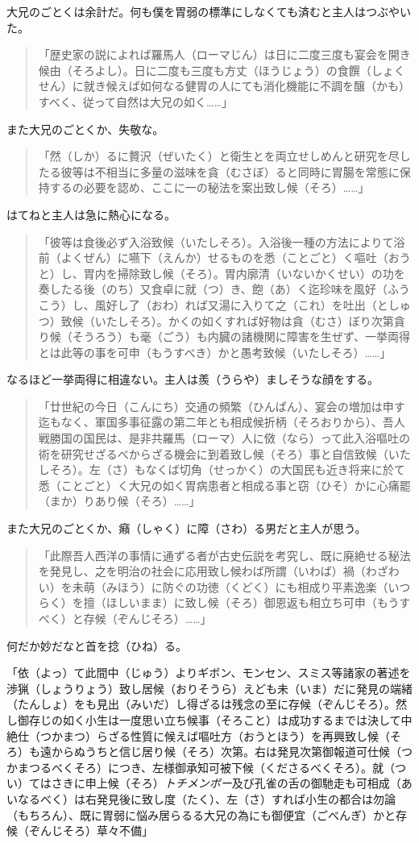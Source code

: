 \documentclass{book}
\begin{document}
大兄のごとくは余計だ。何も僕を胃弱の標準にしなくても済むと主人はつぶやいた。

\blockquote{「歴史家の説によれば羅馬人（ローマじん）は日に二度三度も宴会を開き候由（そろよし）。日に二度も三度も方丈（ほうじょう）の食饌（しょくせん）に就き候えば如何なる健胃の人にても消化機能に不調を醸（かも）すべく、従って自然は大兄の如く\ldots{}\ldots{}」}

また大兄のごとくか、失敬な。

\blockquote{「然（しか）るに贅沢（ぜいたく）と衛生とを両立せしめんと研究を尽したる彼等は不相当に多量の滋味を貪（むさぼ）ると同時に胃腸を常態に保持するの必要を認め、ここに一の秘法を案出致し候（そろ）\ldots{}\ldots{}」}

はてねと主人は急に熱心になる。

\blockquote{「彼等は食後必ず入浴致候（いたしそろ）。入浴後一種の方法によりて浴前（よくぜん）に嚥下（えんか）せるものを悉（ことごと）く嘔吐（おうと）し、胃内を掃除致し候（そろ）。胃内廓清（いないかくせい）の功を奏したる後（のち）又食卓に就（つ）き、飽（あ）く迄珍味を風好（ふうこう）し、風好し了（おわ）れば又湯に入りて之（これ）を吐出（としゅつ）致候（いたしそろ）。かくの如くすれば好物は貪（むさ）ぼり次第貪り候（そうろう）も毫（ごう）も内臓の諸機関に障害を生ぜず、一挙両得とは此等の事を可申（もうすべき）かと愚考致候（いたしそろ）\ldots{}\ldots{}」}

なるほど一挙両得に相違ない。主人は羨（うらや）ましそうな顔をする。

\blockquote{「廿世紀の今日（こんにち）交通の頻繁（ひんぱん）、宴会の増加は申す迄もなく、軍国多事征露の第二年とも相成候折柄（そろおりから）、吾人戦勝国の国民は、是非共羅馬（ローマ）人に傚（なら）って此入浴嘔吐の術を研究せざるべからざる機会に到着致し候（そろ）事と自信致候（いたしそろ）。左（さ）もなくば切角（せっかく）の大国民も近き将来に於て悉（ことごと）く大兄の如く胃病患者と相成る事と窃（ひそ）かに心痛罷（まか）りあり候（そろ）\ldots{}\ldots{}」}

また大兄のごとくか、癪（しゃく）に障（さわ）る男だと主人が思う。

\blockquote{「此際吾人西洋の事情に通ずる者が古史伝説を考究し、既に廃絶せる秘法を発見し、之を明治の社会に応用致し候わば所謂（いわば）禍（わざわい）を未萌（みほう）に防ぐの功徳（くどく）にも相成り平素逸楽（いつらく）を擅（ほしいまま）に致し候（そろ）御恩返も相立ち可申（もうすべく）と存候（ぞんじそろ）\ldots{}\ldots{}」}

何だか妙だなと首を捻（ひね）る。

「依（よっ）て此間中（じゅう）よりギボン、モンセン、スミス等諸家の著述を渉猟（しょうりょう）致し居候（おりそうら）えども未（いま）だに発見の端緒（たんしょ）をも見出（みいだ）し得ざるは残念の至に存候（ぞんじそろ）。然し御存じの如く小生は一度思い立ち候事（そろこと）は成功するまでは決して中絶仕（つかまつ）らざる性質に候えば嘔吐方（おうとほう）を再興致し候（そろ）も遠からぬうちと信じ居り候（そろ）次第。右は発見次第御報道可仕候（つかまつるべくそろ）につき、左様御承知可被下候（くださるべくそろ）。就（つい）てはさきに申上候（そろ）\emph{トチメンボー}及び孔雀の舌の御馳走も可相成（あいなるべく）は右発見後に致し度（たく）、左（さ）すれば小生の都合は勿論（もちろん）、既に胃弱に悩み居らるる大兄の為にも御便宜（ごべんぎ）かと存候（ぞんじそろ）草々不備」
\end{document}
